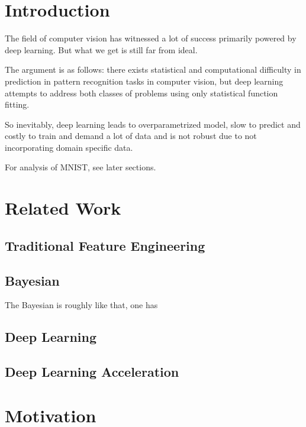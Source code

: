 \documentclass[11pt]{article} 	%
\theoremstyle{definition}
\begin{document}
\clearpage

\tableofcontents

\clearpage


\section{Introduction}

The field of computer vision has witnessed a lot of success primarily powered by deep learning. But what we get is still far from ideal.

The argument is as follows: there exists statistical and computational difficulty in prediction in pattern recognition tasks in computer vision, but deep learning attempts to address both classes of problems using only statistical function fitting.


So inevitably, deep learning leads to overparametrized model, slow to predict and costly to train and demand a lot of data and is not robust due to not incorporating domain specific data.

For analysis of MNIST, see later sections.

\section{Related Work}

\subsection{Traditional Feature Engineering}

\subsection{Bayesian}

The Bayesian is roughly like that, one has 

\subsection{Deep Learning}

\subsection{Deep Learning Acceleration}



\section{Motivation}
\end{document}
